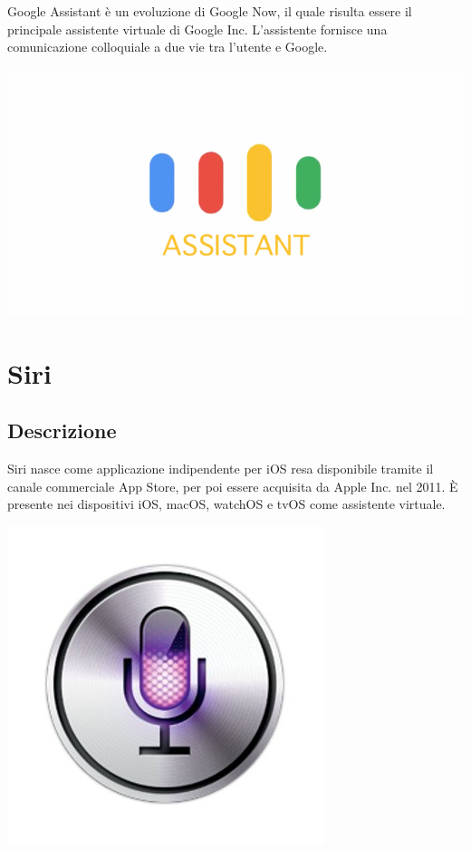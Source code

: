 \documentclass[a4paper,titlepage]{article}
\begin{document}
\begin{minipage}{0.7\textwidth}\raggedright
	Google Assistant è un evoluzione di Google Now, il quale risulta essere il principale assistente virtuale di Google Inc. L'assistente fornisce una comunicazione colloquiale a due vie tra l'utente e Google.
\end{minipage}
\hfill
\noindent\begin{minipage}{0.2\textwidth}
	\includegraphics[scale=0.3]{images/ga.png}
\end{minipage}

\section{Siri}
\subsection{Descrizione}

\begin{minipage}{0.7\textwidth}\raggedright
	Siri nasce come applicazione indipendente per iOS resa disponibile tramite il canale commerciale App Store, per poi essere acquisita da Apple Inc. nel 2011. È presente nei dispositivi iOS, macOS, watchOS e tvOS come assistente virtuale.
\end{minipage}
\hfill
\noindent\begin{minipage}{0.1\textwidth}
	\includegraphics[scale=0.3]{images/siri.jpg}
\end{minipage}
\end{document}
